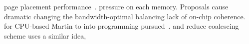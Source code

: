 % 
page placement
performance~\cite{Agarwal2015}.
pressure on
each memory.  Proposals
cause dramatic
changing the bandwidth-optimal 
balancing
lack of on-chip
% 
% 
coherence.
% 
for CPU-based
Martin
to
into
programming
pursued~\cite{choi2011,Sung2013,Sung2015}.
% 
and reduce
coalescing scheme uses a similar idea,
